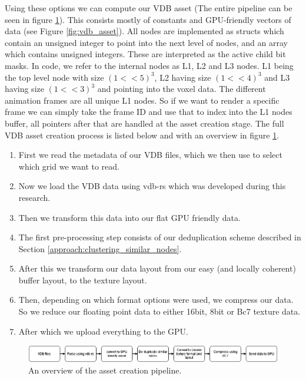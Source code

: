 Using these options we can compute our VDB asset (The entire pipeline can be seen in figure \ref{fig:vdb_asset_pipeline}). This consists mostly of constants and GPU-friendly vectors of data (see Figure \ref{fig:vdb_asset}). All nodes are implemented as structs which contain an unsigned integer to point into the next level of nodes, and an array which contains unsigned integers. These are interpreted as the active child bit masks. In code, we refer to the internal nodes as L1, L2 and L3 nodes. L1 being the top level node with size $(1 << 5)^3$, L2 having size $(1 << 4)^3$ and L3 having size $(1 << 3)^3$ and pointing into the voxel data. The different animation frames are all unique L1 nodes. So if we want to render a specific frame we can simply take the frame ID and use that to index into the L1 nodes buffer, all pointers after that are handled at the asset creation stage. The full VDB asset creation process is listed below and with an overview in figure \ref{fig:vdb_asset_pipeline}.
\begin{enumerate}
    \itemsep0em 
    \item First we read the metadata of our VDB files, which we then use to select which grid we want to read.
    \item Now we load the VDB data using vdb-rs \cite{VDBRS} which was developed during this research.
    \item Then we transform this data into our flat GPU friendly data.
    \item The first pre-processing step consists of our deduplication scheme described in Section \ref{approach:clustering_similar_nodes}.
    \item After this we transform our data layout from our easy (and locally coherent) buffer layout, to the texture layout.
    \item Then, depending on which format options were used, we compress our data. So we reduce our floating point data to either 16bit, 8bit or Bc7 texture data.
    \item After which we upload everything to the GPU.
\end{enumerate}

\begin{figure}[H]
    \centering
    \includegraphics[width=0.9\linewidth]{figures/VDB asset pipeline.png}
    \caption{An overview of the asset creation pipeline.}
    \label{fig:vdb_asset_pipeline}
\end{figure}


